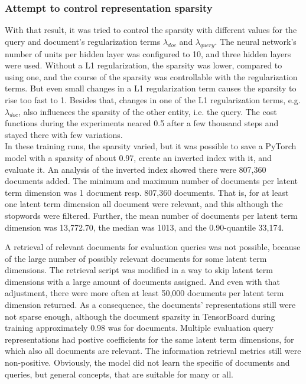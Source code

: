 \subsubsection*{Attempt to control representation sparsity}
With that result, it was tried to control the sparsity with different values for 
    the query and document's regularization terms $\lambda_{doc}$ and $\lambda_{query}$.
The neural network's number of units per hidden layer was configured to 10, and three 
    hidden layers were used.
Without a L1 regularization, the sparsity was lower, compared to using one,
    and the course of the sparsity was controllable with the regularization terms.
But even small changes in a L1 regularization term causes the sparsity to rise too fast to 1.
Besides that, changes in one of the L1 regularization terms, e.g. $\lambda_{doc}$,
    also influences the sparsity of the other entity, i.e. the query.
The cost functions during the experiments neared 0.5 after a few thousand steps and stayed 
    there with few variations.\\
In these training runs, the sparsity varied, but it was possible to save a PyTorch model    
    with a sparsity of about 0.97, create an inverted index with it, and evaluate it.
An analysis of the inverted index showed there were 807,360 documents added.
The minimum and maximum number of documents per latent term dimension was 
    1 document resp. 807,360 documents.
That is, for at least one latent term dimension all document were relevant,
    and this although the stopwords were filtered.
Further, the mean number of documents per latent term dimension was 13,772.70, 
    the median was 1013, and the 0.90-quantile 33,174.

A retrieval of relevant documents for evaluation queries was not possible,
    because of the large number of possibly relevant documents for some 
    latent term dimensions.
The retrieval script was modified in a way to skip latent term dimensions with
    a large amount of documents assigned.
And even with that adjustment, there were more often at least 50,000 documents per 
    latent term dimension returned.
As a consequence, the documents' representations still were not sparse enough, although 
    the document sparsity in TensorBoard during training approximately 0.98 was for documents.
Multiple evaluation query representations had postive coefficients
    for the same latent term dimensions, for which also all documents are relevant.
The information retrieval metrics still were non-positive.
Obviously, the model did not learn the specific of documents and queries, but general
    concepts, that are suitable for many or all.

